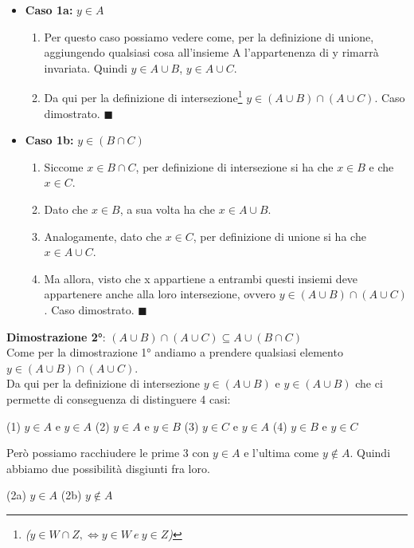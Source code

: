 \begin{itemize}
    \item \textbf{Caso 1a:} $y \in A$
    \begin{enumerate}
        \item Per questo caso possiamo vedere come, per la definizione di unione, aggiungendo qualsiasi cosa all'insieme A l'appartenenza di y rimarrà invariata. Quindi $y \in A \cup B$, $y \in A \cup C$.
        \item Da qui per la definizione di intersezione\footnote{\textit{($y \in W \cap Z, \iff y \in W \: e \: y \in Z$)}} $y \in (A \cup B) \cap (A \cup C)$. Caso dimostrato. $\blacksquare$
    \end{enumerate}
    \newpage
    \item \textbf{Caso 1b:} $y \in (B \cap C)$
    \begin{enumerate}
        \item Siccome $x \in B \cap C$, per definizione di intersezione si ha che $x \in B$ e che $x \in C$.
        \item Dato che $x \in B$, a sua volta ha che $x \in A \cup B$.
        \item Analogamente, dato che $x \in C$, per definizione di unione si ha che $x \in A \cup C$.
        \item Ma allora, visto che x appartiene a entrambi questi insiemi deve appartenere anche alla
        loro intersezione, ovvero $y \in (A \cup B) \cap (A \cup C)$. Caso dimostrato. $\blacksquare$
    \end{enumerate}
\end{itemize}
\textbf{Dimostrazione 2°}: $(A \cup B) \cap (A \cup C) \subseteq A \cup (B \cap C)$ \\
Come per la dimostrazione 1° andiamo a prendere qualsiasi elemento $y \in (A \cup B) \cap (A \cup C)$.\\
Da qui per la definizione di intersezione $y \in (A \cup B)$ e $y \in (A \cup B)$ che ci permette di conseguenza di distinguere 4 casi:
\begin{center}
    (1) $y \in A$ e $y \in A$ \hfill
    (2) $y \in A$ e $y \in B$ \hfill
    (3) $y \in C$ e $y \in A$ \hfill
    (4) $y \in B$ e $y \in C$
\end{center}
Però possiamo racchiudere le prime 3 con $y \in A$ e l'ultima come $y \notin A$. Quindi abbiamo due possibilità disgiunti fra loro.
\begin{center}
    (2a) $y \in A$ \hspace{.5cm}  (2b) $y \notin A$ \\
\end{center}
